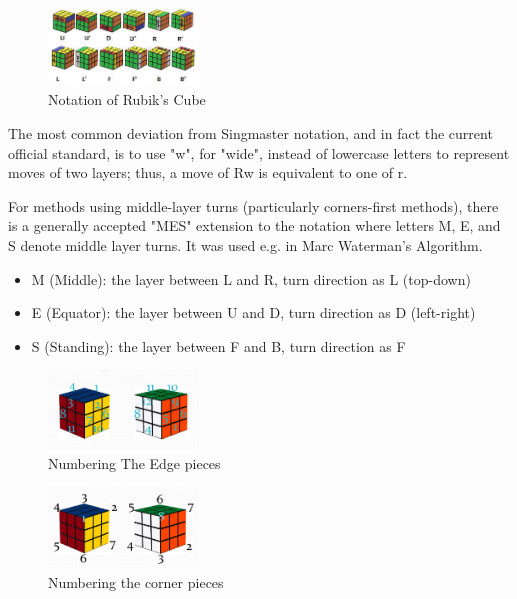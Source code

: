 \documentclass{article}
\begin{document}
\begin{figure}[h!]
    \centering
    \includegraphics[width=4cm]{cube notation.jpg}
    \caption{Notation of Rubik's Cube}
    \label{fig:Rubiks Cube}
\end{figure}

The most common deviation from Singmaster notation, and in fact the current official standard, is to use "w", for "wide", instead of lowercase letters to represent moves of two layers; thus, a move of Rw is equivalent to one of r.\cite{cuberubik}

For methods using middle-layer turns (particularly corners-first methods), there is a generally accepted "MES" extension to the notation where letters M, E, and S denote middle layer turns. It was used e.g. in Marc Waterman's Algorithm.\cite{cuberubik2}

\begin{itemize}
    \item M (Middle): the layer between L and R, turn direction as L (top-down)
    \item E (Equator): the layer between U and D, turn direction as D (left-right)
    \item S (Standing): the layer between F and B, turn direction as F
\end{itemize}
\begin{center}
    \begin{figure}[htp]
    \centering
    \includegraphics[width=4cm]{numbering corners.png}
    \caption{Numbering The Edge pieces}
    \label{fig:Rubiks Cube}
\end{figure}
\begin{figure}[htp]
    \centering
    \includegraphics[width=4cm]{numbering edges.png}
    \caption{Numbering the corner pieces}
    \label{fig:Rubiks Cube}
\end{figure}
\end{center}
\end{document}
